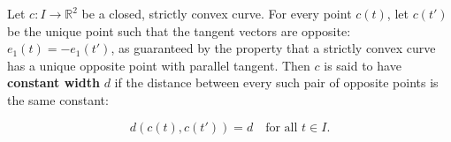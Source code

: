 Let $c: I \to \mathbb{R}^2$ be a closed, strictly convex curve. For every point $c(t)$, let $c(t')$ be the unique point such that the tangent vectors are opposite: $e_1(t) = -e_1(t')$, as guaranteed by the property that a strictly convex curve has a unique opposite point with parallel tangent. Then $c$ is said to have \textbf{constant width} $d$ if the distance between every such pair of opposite points is the same constant:

$$d(c(t), c(t')) = d \quad \text{for all } t \in I.$$
